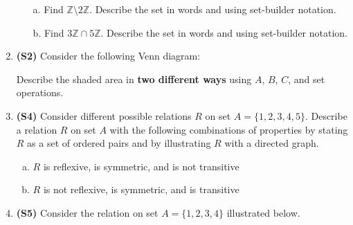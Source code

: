 \documentclass[12pt]{article}
\def\firstcircle{(90:1cm) circle (1.5cm)}
\def\secondcircle{(210:1cm) circle (1.5cm)}
\def\thirdcircle{(330:1cm) circle (1.5cm)}
\begin{document}
\begin{enumerate}
\begin{enumerate}
	\item[a.]
	Find $\mathbb{Z} \setminus 2\mathbb{Z}$. Describe the set in words and using set-builder notation.
	
	\item[b.]
	Find $3\mathbb{Z} \cap 5\mathbb{Z}$. Describe the set in words and using set-builder notation. 
	
\end{enumerate}

\item %
\textbf{(S2)} Consider the following Venn diagram:

\begin{center}
\end{center}

Describe the shaded area in \textbf{two different ways} using $A$, $B$, $C$, and set operations.


\item \textbf{(S4)} %
Consider different possible relations $R$ on set $A=\{1,2,3,4,5\}$. Describe a relation $R$ on set $A$ with the following combinations of properties by stating $R$ as a set of ordered pairs and by illustrating $R$ with a directed graph.

\begin{enumerate}[(a)]
	\item
	$R$ is reflexive, is symmetric, and is not transitive
	
	\item
	$R$ is not reflexive, is symmetric, and is transitive
	
\end{enumerate}


\item %
\textbf{(S5)} Consider the relation on set $A=\{1,2,3,4\}$  illustrated below. 


\end{enumerate}
\end{document}
